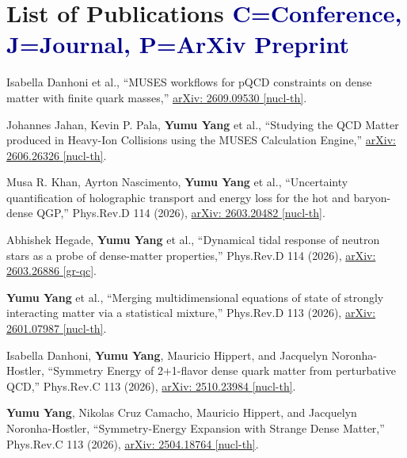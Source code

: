 \documentclass[a4paper,11pt]{article}
\begin{document}
\section{\textbf{List of Publications} \hfill \textcolor{darkblue}{\scriptsize C=Conference, J=Journal, P=ArXiv Preprint}}
\vspace{0.2mm}
\small{

\begin{prelist}

\item Isabella Danhoni et al., ``MUSES workflows for pQCD constraints on dense matter with finite quark masses,'' \href{https://arxiv.org/abs/2609.09530}{arXiv: 2609.09530 [nucl-th]}.  

\item Johannes Jahan, Kevin P. Pala, \textbf{Yumu Yang} et al., ``Studying the QCD Matter produced in Heavy-Ion Collisions using the MUSES Calculation Engine,'' \href{https://arxiv.org/abs/2606.26326}{arXiv: 2606.26326 [nucl-th]}.  

\end{prelist}

\begin{publist}
\item Musa R. Khan, Ayrton Nascimento, \textbf{Yumu Yang} et al., ``Uncertainty quantification of holographic transport and energy loss for the hot and baryon-dense QGP,'' Phys.Rev.D 114 (2026), \href{https://arxiv.org/abs/2603.20482}{arXiv: 2603.20482 [nucl-th]}.

\item Abhishek Hegade, \textbf{Yumu Yang} et al., ``Dynamical tidal response of neutron stars as a probe of dense-matter properties,'' Phys.Rev.D 114 (2026), \href{https://arxiv.org/abs/2603.26886}{arXiv: 2603.26886 [gr-qc]}.

\item \textbf{Yumu Yang} et al., ``Merging multidimensional equations of state of strongly interacting matter via a statistical mixture,'' Phys.Rev.D 113 (2026), \href{https://arxiv.org/abs/2601.07987}{arXiv: 2601.07987 [nucl-th]}. 

\item Isabella Danhoni, \textbf{Yumu Yang}, Mauricio Hippert, and Jacquelyn Noronha-Hostler, ``Symmetry Energy of 2+1-flavor dense quark matter from perturbative QCD,'' Phys.Rev.C 113 (2026), \href{https://arxiv.org/abs/2510.23984}{arXiv: 2510.23984 [nucl-th]}. 

\item \textbf{Yumu Yang}, Nikolas Cruz Camacho, Mauricio Hippert, and Jacquelyn Noronha-Hostler, ``Symmetry-Energy Expansion with Strange Dense Matter,'' Phys.Rev.C 113 (2026), \href{https://arxiv.org/abs/2504.18764}{arXiv: 2504.18764 [nucl-th]}. 


\end{publist}}
\end{document}
